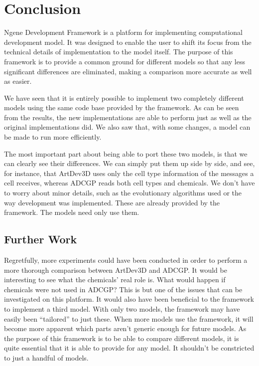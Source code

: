 \section{Conclusion}
Ngene Development Framework is a platform for implementing computational development model. It was designed to enable the user to shift its focus from the technical details of implementation to the model itself. The purpose of this framework is to provide a common ground for different models so that any less significant differences are eliminated, making a comparison more accurate as well as easier.

We have seen that it is entirely possible to implement two completely different models using the same code base provided by the framework. As can be seen from the results, the new implementations are able to perform just as well as the original implementations did. We also saw that, with some changes, a model can be made to run more efficiently.

The most important part about being able to port these two models, is that we can clearly see their differences. We can simply put them up side by side, and see, for instance, that ArtDev3D uses only the cell type information of the messages a cell receives, whereas ADCGP reads both cell types and chemicals. We don't have to worry about minor details, such as the evolutionary algorithms used or the way development was implemented. These are already provided by the framework. The models need only use them.


\subsection{Further Work}

Regretfully, more experiments could have been conducted in order to perform a more thorough comparison between ArtDev3D and ADCGP. It would be interesting to see what the chemicals' real role is. What would happen if chemicals were not used in ADCGP? This is but one of the issues that can be investigated on this platform. It would also have been beneficial to the framework to implement a third model. With only two models, the framework may have easily been ``tailored'' to just these. When more models use the framework, it will become more apparent which parts aren't generic enough for future models. As the purpose of this framework is to be able to compare different models, it is quite essential that it is able to provide for any model. It shouldn't be constricted to just a handful of models.

